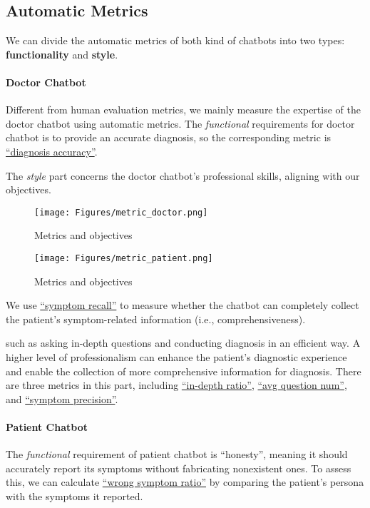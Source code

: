 \subsection{Automatic Metrics}
We can divide the automatic metrics of both kind of chatbots into two types: \textbf{functionality} and \textbf{style}.
\paragraph{Doctor Chatbot}
Different from human evaluation metrics, we mainly measure the expertise of the doctor chatbot using automatic metrics. 
The \textit{functional} requirements for doctor chatbot is to provide an accurate diagnosis, so the corresponding metric is \uline{``diagnosis accuracy''}. 


The \textit{style} part concerns the doctor chatbot's professional skills, aligning with our objectives. 

\begin{figure}[th]
	\centering
	\texttt{[image: Figures/metric\_doctor.png]}
	\caption{Metrics and objectives}
	\label{fig:doc_metric}
\end{figure}

\begin{figure}[th]
	\centering
	\texttt{[image: Figures/metric\_patient.png]}
	\caption{Metrics and objectives}
	\label{fig:pat_metric}
\end{figure}

We use \uline{``symptom recall''} to measure whether the chatbot can completely collect the patient's symptom-related information (i.e., comprehensiveness). 

such as asking in-depth questions and conducting diagnosis in an efficient way. A higher level of professionalism can enhance the patient's diagnostic experience and enable the collection of more comprehensive information for diagnosis. There are three metrics in this part, including  \uline{``in-depth ratio''}, \uline{``avg question num''}, and \uline{``symptom precision''}. 

\paragraph{Patient Chatbot} 
The \textit{functional} requirement of patient chatbot is ``honesty'', meaning it should accurately report its symptoms without fabricating nonexistent ones. To assess this, we can calculate \uline{``wrong symptom ratio''} by comparing the patient's persona with the symptoms it reported. 

